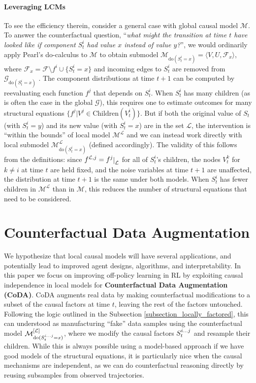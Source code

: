 \documentclass{article}
\newcommand{\DO}{\textrm{do}}
\newcommand{\M}{\mathcal{M}}
\renewcommand{\L}{\mathcal{L}}
\newcommand{\F}{\mathcal{F}}
\newcommand{\G}{\mathcal{G}}
\newcommand\restrict[1]{\raisebox{-.2ex}{$|$}_{#1}}
\newcommand\mydots{\ifmmode\ldots\else\makebox[1em][c]{.\hfil.\hfil.}\thinspace\fi}
\begin{document}
\paragraph{Leveraging LCMs} To see the efficiency therein, consider a general case with global causal model $\M$.
To answer the counterfactual question, ``\textit{what might the transition at time $t$ have looked like if component $S_t^i$ had value $x$ instead of value $y$?}'', we would ordinarily apply Pearl's do-calculus to $\M$ to obtain submodel $\M_{\DO(S_t^i = x)} = \langle V, U, \F_x \rangle$, where $\F_x = \F\setminus f^i \cup \{S_t^i = x\}$ and incoming edges to $S_t^i$ are removed from $\G_{\DO(S_t^i = x)}$ \cite{pearl2009causal}. The component distributions at time $t+1$ can be computed by reevaluating each function $f^j$ that depends on $S_t^i$. When $S_t^i$ has many children (as is often the case in the global $\G$), this requires one to estimate outcomes for many structural equations 
$\{f^j | V^j \in \text{Children}(V^i_t)\}$. 
%
But if both the original value of $S_t$ (with $S_t^i = y$) and its new value (with $S_t^i = x$) are in the set $\L$, the intervention is ``within the bounds'' of local model $\M^\L$ and we can instead work directly with local submodel $\M^\L_{\DO(S_t^i = x)}$ (defined accordingly). The validity of this follows from the definitions: since $f^{\L,j} = f^j\restrict{\L}$ for all of $S_t^i$'s children, the nodes $V_t^k$ for $k \not= i$ at time $t$ are held fixed, and the noise variables at time $t+1$ are unaffected, the distribution at time $t+1$ is the same under both models. When $S_t^i$ has fewer children in $\M^\L$ than in $\M$, this reduces the number of structural equations that need to be considered. 


\section{Counterfactual Data Augmentation} \label{section_coda}

We hypothesize that local causal models will have several applications, and potentially lead to improved agent designs, algorithms, and interpretability. In this paper we focus on improving off-policy learning in RL by exploiting causal independence in local models for \textbf{Counterfactual Data Augmentation (CoDA)}. CoDA augments real data by making counterfactual modifications to a subset of the causal factors at time $t$, leaving the rest of the factors untouched. Following the logic outlined in the Subsection \ref{subsection_locally_factored}, this can understood as manufacturing ``fake'' data samples using the counterfactual model $\M^{[\L]}_{\DO(S_t^{i\mydots j} = x)}$, where we modify the causal factors $S_t^{i\mydots j}$ and resample their children. While this is always possible using a model-based approach if we have good models of the structural equations, it is particularly nice when the causal mechanisms are independent, as we can do counterfactual reasoning 
directly by reusing subsamples from observed trajectories. 
\end{document}
